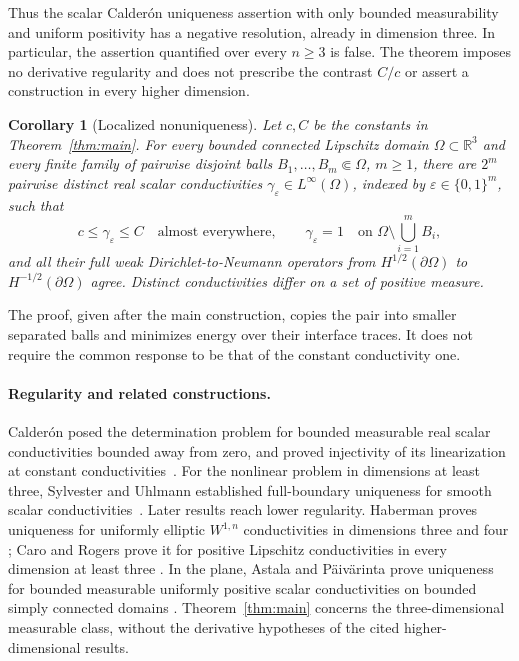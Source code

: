\documentclass[11pt]{article}
\numberwithin{equation}{section}
\newtheorem{corollary}[theorem]{Corollary}
\theoremstyle{definition}
\theoremstyle{remark}
\newcommand{\R}{\mathbb R}
\begin{document}
Thus the scalar Calder\'on uniqueness assertion with only bounded
measurability and uniform positivity has a negative resolution, already
in dimension three. In particular, the assertion quantified over every
$n\geq3$ is false. The theorem imposes no derivative regularity and
does not prescribe the contrast $C/c$ or assert a construction in every
higher dimension.

\begin{corollary}[Localized nonuniqueness]\label{cor:localized}
Let $c,C$ be the constants in Theorem~\ref{thm:main}.
For every bounded connected Lipschitz domain $\Omega\subset\R^3$
and every finite family of pairwise disjoint balls
$B_1,\ldots,B_m\Subset\Omega$, $m\geq1$, there are $2^m$
pairwise distinct real scalar conductivities
$\gamma_\varepsilon\in L^\infty(\Omega)$, indexed by
$\varepsilon\in\{0,1\}^m$, such that
\[
 c\leq\gamma_\varepsilon\leq C\quad\text{almost everywhere},
 \qquad
 \gamma_\varepsilon=1\quad\text{on }
 \Omega\setminus\bigcup_{i=1}^m B_i,
\]
and all their full weak Dirichlet-to-Neumann operators from
$H^{1/2}(\partial\Omega)$ to $H^{-1/2}(\partial\Omega)$ agree.
Distinct conductivities differ on a set of positive measure.
\end{corollary}

The proof, given after the main construction, copies the pair into
smaller separated balls and minimizes energy over their interface
traces. It does not require the common response to be that of the
constant conductivity one.

\paragraph{Regularity and related constructions.}
Calder\'on posed the determination problem for bounded measurable real
scalar conductivities bounded away from zero, and proved injectivity of
its linearization at constant conductivities~\cite{Calderon}.
For the nonlinear problem in dimensions at least three, Sylvester and
Uhlmann established full-boundary uniqueness for smooth scalar
conductivities~\cite{SylvesterUhlmann}. Later results reach lower
regularity. Haberman proves uniqueness for uniformly elliptic
$W^{1,n}$ conductivities in dimensions three and four
\cite[Theorem~1.1]{Haberman}; Caro and Rogers prove it for positive
Lipschitz conductivities in every dimension at least three
\cite[Theorem~1.1]{CaroRogers}. In the plane, Astala and P\"aiv\"arinta
prove uniqueness for bounded measurable uniformly positive scalar
conductivities on bounded simply connected domains
\cite[Theorem~1]{AstalaPaivarinta}. Theorem~\ref{thm:main} concerns the
three-dimensional measurable class, without the derivative hypotheses
of the cited higher-dimensional results.
\end{document}
